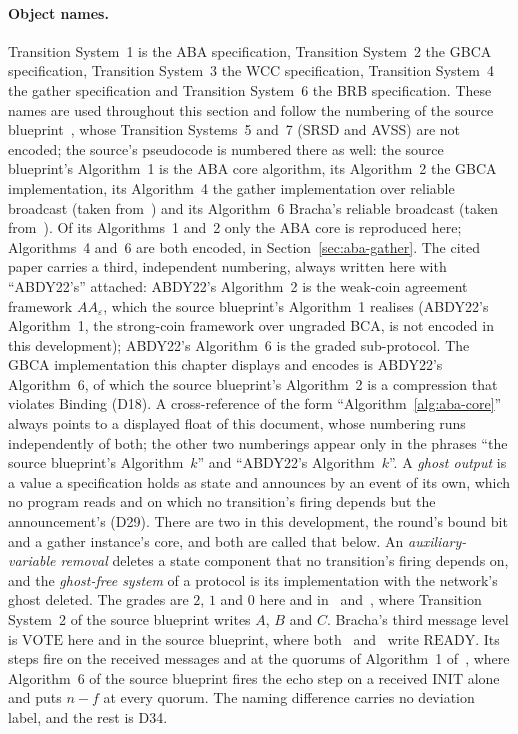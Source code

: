 \paragraph{Object names.}
Transition System~1 is the ABA specification, Transition System~2 the GBCA specification, Transition System~3 the WCC specification, Transition System~4 the gather specification and Transition System~6 the BRB specification.
These names are used throughout this section and follow the numbering of the source blueprint~\cite{LeslieBP}, whose Transition Systems~5 and~7 (SRSD and AVSS) are not encoded; the source's pseudocode is numbered there as well: the source blueprint's Algorithm~1 is the ABA core algorithm, its Algorithm~2 the GBCA implementation, its Algorithm~4 the gather implementation over reliable broadcast (taken from~\cite{AFW25}) and its Algorithm~6 Bracha's reliable broadcast (taken from~\cite{Bra87}).
Of its Algorithms~1 and~2 only the ABA core is reproduced here; Algorithms~4 and~6 are both encoded, in Section~\ref{sec:aba-gather}.
The cited paper carries a third, independent numbering, always written here with ``ABDY22's'' attached: ABDY22's Algorithm~2 is the weak-coin agreement framework $AA_\varepsilon$, which the source blueprint's Algorithm~1 realises (ABDY22's Algorithm~1, the strong-coin framework over ungraded BCA, is not encoded in this development); ABDY22's Algorithm~6 is the graded sub-protocol.
The GBCA implementation this chapter displays and encodes is ABDY22's Algorithm~6, of which the source blueprint's Algorithm~2 is a compression that violates Binding (D18).
A cross-reference of the form ``Algorithm~\ref{alg:aba-core}'' always points to a displayed float of this document, whose numbering runs independently of both; the other two numberings appear only in the phrases ``the source blueprint's Algorithm~$k$'' and ``ABDY22's Algorithm~$k$''.
A \emph{ghost output} is a value a specification holds as state and announces by an event of its own, which no program reads and on which no transition's firing depends but the announcement's (D29).
There are two in this development, the round's bound bit and a gather instance's core, and both are called that below.
An \emph{auxiliary-variable removal} deletes a state component that no transition's firing depends on, and the \emph{ghost-free system} of a protocol is its implementation with the network's ghost deleted.
The grades are $2$, $1$ and $0$ here and in~\cite{ABDY22} and~\cite{AFW25}, where Transition System~2 of the source blueprint writes $A$, $B$ and $C$.
Bracha's third message level is $\mathrm{VOTE}$ here and in the source blueprint, where both~\cite{ABDY22} and~\cite{AFW25} write $\mathrm{READY}$.
Its steps fire on the received messages and at the quorums of Algorithm~1 of~\cite{AFW25}, where Algorithm~6 of the source blueprint fires the echo step on a received $\mathrm{INIT}$ alone and puts $n-f$ at every quorum.
The naming difference carries no deviation label, and the rest is D34.


